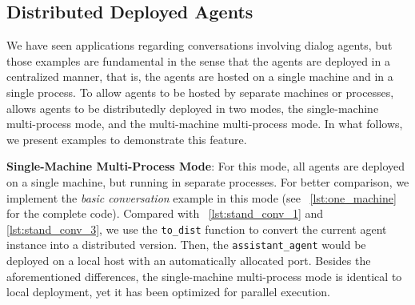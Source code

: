 \subsection{Distributed Deployed Agents}

We have seen applications regarding conversations involving dialog agents, but those examples are fundamental in the sense that the agents are deployed in a centralized manner, that is, the agents are hosted on a single machine and in a single process. To allow agents to be hosted by separate machines or processes, \ours allows agents to be distributedly deployed in two modes, the single-machine multi-process mode, and the multi-machine multi-process mode. In what follows, we present examples to demonstrate this feature.

\noindent\textbf{Single-Machine Multi-Process Mode}: For this mode, all agents are deployed on a single machine, but running in separate processes. For better comparison, we implement the \textit{basic conversation} example in this mode (see \lstlistingname~\ref{lst:one_machine} for the complete code). Compared with \lstlistingname~\ref{lst:stand_conv_1} and \ref{lst:stand_conv_3}, we use the \texttt{to\_dist} function to convert the current agent instance into a distributed version. Then, the \texttt{assistant\_agent} would be deployed on a local host with an automatically allocated port. Besides the aforementioned differences, the single-machine multi-process mode is identical to local deployment, yet it has been optimized for parallel execution.

